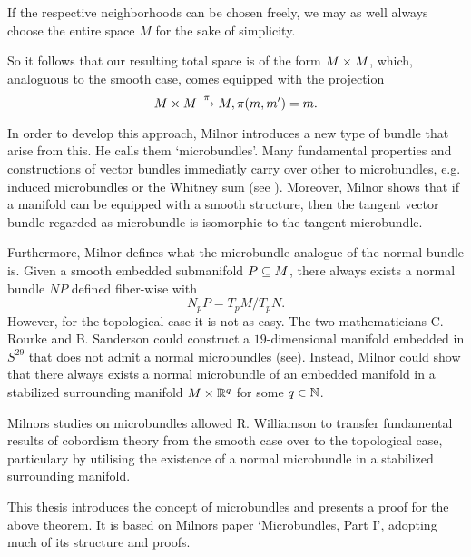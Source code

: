 \begin{myparagraph}
    If the respective neighborhoods can be chosen freely,
    we may as well always choose the entire space $M$ for the sake of simplicity.

    So it follows that our resulting total space is of the form $M \times M$, which,
    analoguous to the smooth case, comes equipped with the projection
    \[ M \times M \xrightarrow{\pi} M, \pi(m, m') = m. \]
    
    In order to develop this approach, Milnor introduces a new type of bundle
    that arise from this.
    He calls them `microbundles'.
    Many fundamental properties
    and constructions of vector bundles immediatly carry over other to microbundles,
    e.g. induced microbundles or the Whitney sum (see ).
    Moreover, Milnor shows that if a manifold can be equipped with a smooth structure,
    then the tangent vector bundle regarded as microbundle is isomorphic to the
    tangent microbundle.

    Furthermore, Milnor defines what the microbundle analogue
    of the normal bundle is.
    Given a smooth embedded submanifold $P \subseteq{} M$,
    there always exists a normal bundle $NP$ defined fiber-wise with
    \[ N_p P = T_p M / T_p N. \]
    However, for the topological case it is not as easy.
    The two mathematicians C. Rourke and B. Sanderson could construct a $19$-dimensional manifold
    embedded in $S^{29}$ that does not admit a normal microbundles (see\cite{rourke}).
    Instead, Milnor could show that there always exists a normal microbundle
    of an embedded manifold
    in a stabilized surrounding manifold $M \times \mathbb{R}^q$ for some $q \in \mathbb{N}$.

    Milnors studies on microbundles allowed R. Williamson
    to transfer fundamental results of cobordism theory from the smooth case
    over to the topological case, particulary by utilising the existence
    of a normal microbundle in a stabilized surrounding manifold.

    This thesis introduces the concept of microbundles and presents
    a proof for the above theorem.
    It is based on Milnors paper `Microbundles, Part I',
    adopting much of its structure and proofs.
\end{myparagraph}